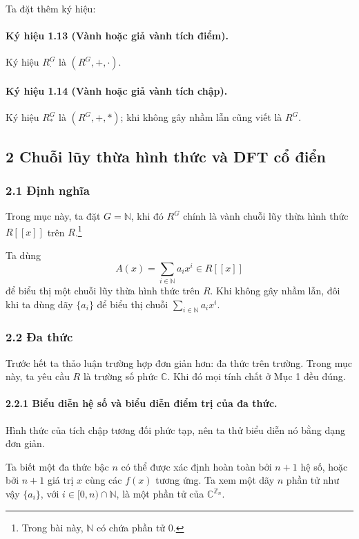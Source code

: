 \documentclass[11pt]{article}
\begin{document}
Ta đặt thêm ký hiệu:

\paragraph{Ký hiệu 1.13 (Vành hoặc giả vành tích điểm).}
Ký hiệu \(R^G_{\cdot}\) là \((R^G,+,\cdot)\).

\paragraph{Ký hiệu 1.14 (Vành hoặc giả vành tích chập).}
Ký hiệu \(R^G_*\) là \((R^G,+,*)\); khi không gây nhầm lẫn cũng viết là \(R^G\).

\subsection*{2 Chuỗi lũy thừa hình thức và DFT cổ điển}

\subsubsection*{2.1 Định nghĩa}

Trong mục này, ta đặt \(G=\mathbb N\), khi đó \(R^G\) chính là vành chuỗi lũy
thừa hình thức \(R[[x]]\) trên \(R\).\footnote{Trong bài này, \(\mathbb N\) có
chứa phần tử \(0\).}

Ta dùng
\[
  A(x)=\sum_{i\in\mathbb N} a_i x^i\in R[[x]]
\]
để biểu thị một chuỗi lũy thừa hình thức trên \(R\). Khi không gây nhầm lẫn, đôi
khi ta dùng dãy \(\{a_i\}\) để biểu thị chuỗi \(\sum_{i\in\mathbb N}a_i x^i\).

\subsubsection*{2.2 Đa thức}

Trước hết ta thảo luận trường hợp đơn giản hơn: đa thức trên trường. Trong mục
này, ta yêu cầu \(R\) là trường số phức \(\mathbb C\). Khi đó mọi tính chất ở
Mục 1 đều đúng.

\paragraph{2.2.1 Biểu diễn hệ số và biểu diễn điểm trị của đa thức.}
Hình thức của tích chập tương đối phức tạp, nên ta thử biểu diễn nó bằng dạng
đơn giản.

Ta biết một đa thức bậc \(n\) có thể được xác định hoàn toàn bởi \(n+1\) hệ số,
hoặc bởi \(n+1\) giá trị \(x\) cùng các \(f(x)\) tương ứng. Ta xem một dãy \(n\)
phần tử như vậy \(\{a_i\}\), với \(i\in[0,n)\cap\mathbb N\), là một phần tử của
\(\mathbb C^{\mathbb Z_n}\).
\end{document}
